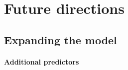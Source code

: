 



\section{Future directions} 

\subsection{Expanding the model} 

\paragraph{Additional predictors}

